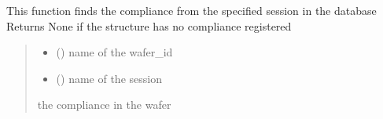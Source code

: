 \documentclass[letterpaper,10pt,english]{sphinxmanual}
\begin{document}
\begin{fulllineitems}
\label{\detokenize{VBD:VBD.get_compliance}}
\pysigstartsignatures
{}
\pysigstopsignatures
\sphinxAtStartPar
This function finds the compliance from the specified session in the database
Returns None if the structure has no compliance registered
\begin{quote}\begin{description}
\begin{itemize}
\item {} 
\sphinxAtStartPar
{} () \textendash{} name of the wafer\_id

\item {} 
\sphinxAtStartPar
{} () \textendash{} name of the session

\end{itemize}

\sphinxAtStartPar
the compliance in the wafer

\end{description}\end{quote}

\end{fulllineitems}

\end{document}
